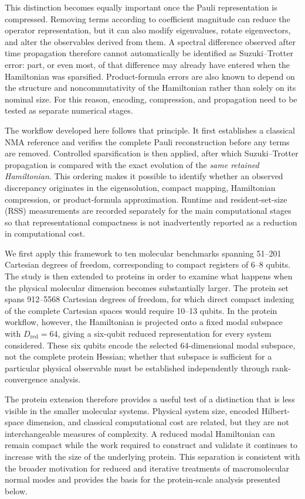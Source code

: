 \documentclass[aip,jcp,reprint,amsmath,amssymb,floatfix]{revtex4-2}
\begin{document}
This distinction becomes equally important once the Pauli representation is
compressed. Removing terms according to coefficient magnitude can reduce the
operator representation, but it can also modify eigenvalues, rotate
eigenvectors, and alter the observables derived from them. A spectral
difference observed after time propagation therefore cannot automatically be
identified as Suzuki--Trotter error: part, or even most, of that difference
may already have entered when the Hamiltonian was sparsified. Product-formula
errors are also known to depend on the structure and noncommutativity of the
Hamiltonian rather than solely on its nominal size. For this reason, encoding,
compression, and propagation need to be tested as separate numerical stages.

The workflow developed here follows that principle. It first establishes a
classical NMA reference and verifies the complete Pauli reconstruction before
any terms are removed. Controlled sparsification is then applied, after which
Suzuki--Trotter propagation is compared with the exact evolution of the
\emph{same retained Hamiltonian}. This ordering makes it possible to identify
whether an observed discrepancy originates in the eigensolution, compact
mapping, Hamiltonian compression, or product-formula approximation. Runtime
and resident-set-size (RSS) measurements are recorded separately for the main
computational stages so that representational compactness is not inadvertently
reported as a reduction in computational cost.

We first apply this framework to ten molecular benchmarks spanning
51--201 Cartesian degrees of freedom, corresponding to compact registers of
6--8 qubits. The study is then extended to proteins in order to examine what
happens when the physical molecular dimension becomes substantially larger.
The protein set spans 912--5568 Cartesian degrees of freedom, for which direct
compact indexing of the complete Cartesian spaces would require 10--13
qubits. In the protein workflow, however, the Hamiltonian is projected onto a
fixed modal subspace with $D_{\mathrm{red}}=64$, giving a six-qubit reduced
representation for every system considered. These six qubits encode the
selected 64-dimensional modal subspace, not the complete protein Hessian;
whether that subspace is sufficient for a particular physical observable must
be established independently through rank-convergence analysis.

The protein extension therefore provides a useful test of a distinction that
is less visible in the smaller molecular systems. Physical system size,
encoded Hilbert-space dimension, and classical computational cost are related,
but they are not interchangeable measures of complexity. A reduced modal
Hamiltonian can remain compact while the work required to construct and
validate it continues to increase with the size of the underlying protein.
This separation is consistent with the broader motivation for reduced and
iterative treatments of macromolecular normal modes
\cite{Ghysels2010PartialHessian,Bauer2019NMA,Kolossvary2024NMA} and provides
the basis for the protein-scale analysis presented below.
\end{document}
